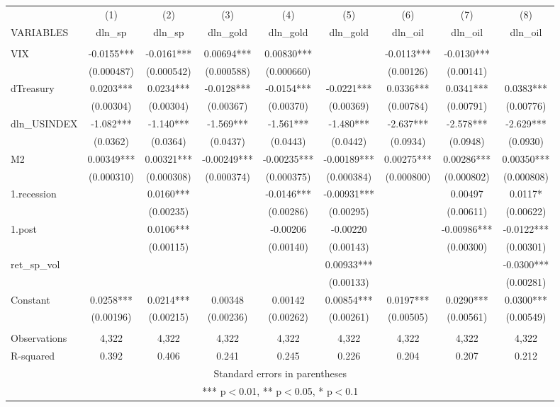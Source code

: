 \documentclass[]{article}
\begin{document}
\begin{tabular}{lcccccccc} \hline
 & (1) & (2) & (3) & (4) & (5) & (6) & (7) & (8) \\
VARIABLES & dln\_sp & dln\_sp & dln\_gold & dln\_gold & dln\_gold & dln\_oil & dln\_oil & dln\_oil \\ \hline
 &  &  &  &  &  &  &  &  \\
VIX & -0.0155*** & -0.0161*** & 0.00694*** & 0.00830*** &  & -0.0113*** & -0.0130*** &  \\
 & (0.000487) & (0.000542) & (0.000588) & (0.000660) &  & (0.00126) & (0.00141) &  \\
dTreasury & 0.0203*** & 0.0234*** & -0.0128*** & -0.0154*** & -0.0221*** & 0.0336*** & 0.0341*** & 0.0383*** \\
 & (0.00304) & (0.00304) & (0.00367) & (0.00370) & (0.00369) & (0.00784) & (0.00791) & (0.00776) \\
dln\_USINDEX & -1.082*** & -1.140*** & -1.569*** & -1.561*** & -1.480*** & -2.637*** & -2.578*** & -2.629*** \\
 & (0.0362) & (0.0364) & (0.0437) & (0.0443) & (0.0442) & (0.0934) & (0.0948) & (0.0930) \\
M2 & 0.00349*** & 0.00321*** & -0.00249*** & -0.00235*** & -0.00189*** & 0.00275*** & 0.00286*** & 0.00350*** \\
 & (0.000310) & (0.000308) & (0.000374) & (0.000375) & (0.000384) & (0.000800) & (0.000802) & (0.000808) \\
1.recession &  & 0.0160*** &  & -0.0146*** & -0.00931*** &  & 0.00497 & 0.0117* \\
 &  & (0.00235) &  & (0.00286) & (0.00295) &  & (0.00611) & (0.00622) \\
1.post &  & 0.0106*** &  & -0.00206 & -0.00220 &  & -0.00986*** & -0.0122*** \\
 &  & (0.00115) &  & (0.00140) & (0.00143) &  & (0.00300) & (0.00301) \\
ret\_sp\_vol &  &  &  &  & 0.00933*** &  &  & -0.0300*** \\
 &  &  &  &  & (0.00133) &  &  & (0.00281) \\
Constant & 0.0258*** & 0.0214*** & 0.00348 & 0.00142 & 0.00854*** & 0.0197*** & 0.0290*** & 0.0300*** \\
 & (0.00196) & (0.00215) & (0.00236) & (0.00262) & (0.00261) & (0.00505) & (0.00561) & (0.00549) \\
 &  &  &  &  &  &  &  &  \\
Observations & 4,322 & 4,322 & 4,322 & 4,322 & 4,322 & 4,322 & 4,322 & 4,322 \\
 R-squared & 0.392 & 0.406 & 0.241 & 0.245 & 0.226 & 0.204 & 0.207 & 0.212 \\ \hline
\multicolumn{9}{c}{ Standard errors in parentheses} \\
\multicolumn{9}{c}{ *** p$<$0.01, ** p$<$0.05, * p$<$0.1} \\
\end{tabular}
\end{document}
